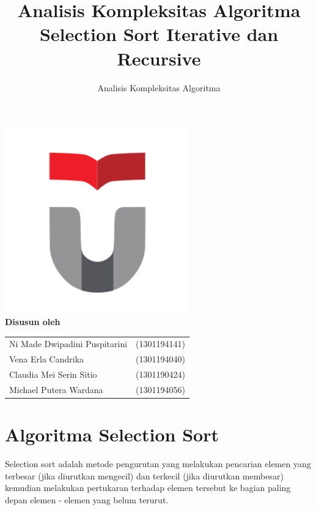 \documentclass[12pt]{article}
\title{Analisis Kompleksitas Algoritma Selection Sort Iterative dan Recursive}
\author{Analisis Kompleksitas Algoritma}
\begin{document}
\maketitle
\begin{center}
    \includegraphics[width=8cm, height=8cm]{images/logo_telkom.png}
    \vspace{1cm}
    \\
    \textbf {Disusun oleh} \linebreak
    \\
    \begin{tabular}{ll}       
    Ni Made Dwipadini Puspitarini &(1301194141)\\
    Vena Erla Candrika &(1301194040)\\
    Claudia Mei Serin Sitio &(1301190424)\\
    Michael Putera Wardana &(1301194056)   
    \end{tabular}
\end{center}
\newpage
\section{Algoritma Selection Sort}
Selection sort adalah metode pengurutan yang melakukan pencarian elemen yang terbesar (jika diurutkan mengecil) dan terkecil (jika diurutkan membesar) kemudian melakukan pertukaran terhadap elemen tersebut ke bagian paling depan elemen - elemen yang belum terurut.
\end{document}
